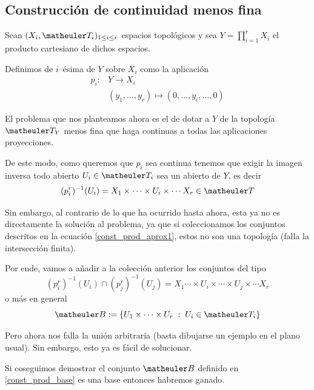 \subsection{Construcción de continuidad menos fina}
Sean $(X_{i },\T_{i})_{1\le i\le r}$ espacios topológicos y sea $Y=\prod_{i=1}^{r} X_i$ el producto cartesiano de dichos espacios.
\begin{defi}[Proyecciones]
	Definimos de  $i$--ésima de $Y$ sobre $X_i$ como la aplicación
	\begin{equation}
	\begin{array}{cc}
	p_i:&Y\to X_i\\
	& (y_1,\dots,y_r)\mapsto(0,\dots,y_i,\dots,0)
	\end{array}
	\end{equation}
\end{defi}
El problema que nos planteamos ahora es el de dotar a $Y$ de la topología $\T_Y$ menos fina que haga continuas a todas las aplicaciones proyecciones.

De este modo, como queremos que $p_i$ sea continua tenemos que exigir la imagen inversa todo abierto $U_i\in \T_i$ sea un abierto de $Y$, es decir
\begin{equation}\label{const_prod_aprox1}(p_i^r)^{-1}(U_i)=X_1\times\cdots\times U_i\times\cdots X_r\in\T\end{equation}

Sin embargo, al contrario de lo que ha ocurrido hasta ahora, esta ya no es directamente la solución al problema, ya que si coleccionamos los conjuntos descritos en la ecuación \ref{const_prod_aprox1}, estos no son una topología (falla la intersección finita).

Por ende, vamos a añadir a la colección anterior los conjuntos del tipo
\[(p_i^r)^{-1}(U_i)\cap (p_j^r)^{-1}(U_j)= X_1\cdots\times U_i \times\cdots\times U_j\times \cdots X_r\]
o más en general
\begin{equation}\label{const_prod_base}\B:=\{ U_1\times\cdots\times U_r\midc U_i\in \T_i \}\end{equation}

Pero ahora nos falla la unión arbitraria (basta dibujarse un ejemplo en el plano usual). Sin embargo, esto ya es fácil de solucionar.

Si coseguimos demostrar el conjunto $\B$ definido en \ref{const_prod_base} es una base entonces habremos ganado.

